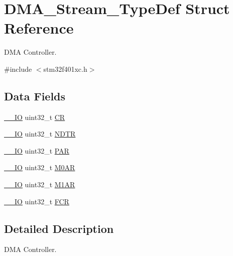 \hypertarget{struct_d_m_a___stream___type_def}{}\section{D\+M\+A\+\_\+\+Stream\+\_\+\+Type\+Def Struct Reference}
\label{struct_d_m_a___stream___type_def}


D\+MA Controller.  




{\ttfamily \#include $<$stm32f401xc.\+h$>$}

\subsection*{Data Fields}
\begin{DoxyCompactItemize}
\item 
\hyperlink{core__sc300_8h_aec43007d9998a0a0e01faede4133d6be}{\+\_\+\+\_\+\+IO} uint32\+\_\+t \hyperlink{struct_d_m_a___stream___type_def_ab40c89c59391aaa9d9a8ec011dd0907a}{CR}
\item 
\hyperlink{core__sc300_8h_aec43007d9998a0a0e01faede4133d6be}{\+\_\+\+\_\+\+IO} uint32\+\_\+t \hyperlink{struct_d_m_a___stream___type_def_af60258ad5a25addc1e8969665d0c1731}{N\+D\+TR}
\item 
\hyperlink{core__sc300_8h_aec43007d9998a0a0e01faede4133d6be}{\+\_\+\+\_\+\+IO} uint32\+\_\+t \hyperlink{struct_d_m_a___stream___type_def_aef55be3d948c22dd32a97e8d4f8761fd}{P\+AR}
\item 
\hyperlink{core__sc300_8h_aec43007d9998a0a0e01faede4133d6be}{\+\_\+\+\_\+\+IO} uint32\+\_\+t \hyperlink{struct_d_m_a___stream___type_def_a63b4d166f4ab5024db6b493a7ab7b640}{M0\+AR}
\item 
\hyperlink{core__sc300_8h_aec43007d9998a0a0e01faede4133d6be}{\+\_\+\+\_\+\+IO} uint32\+\_\+t \hyperlink{struct_d_m_a___stream___type_def_aee7782244ceb4791d9a3891804ac47ac}{M1\+AR}
\item 
\hyperlink{core__sc300_8h_aec43007d9998a0a0e01faede4133d6be}{\+\_\+\+\_\+\+IO} uint32\+\_\+t \hyperlink{struct_d_m_a___stream___type_def_a5d5cc7f32884945503dd29f8f6cbb415}{F\+CR}
\end{DoxyCompactItemize}


\subsection{Detailed Description}
D\+MA Controller. 


